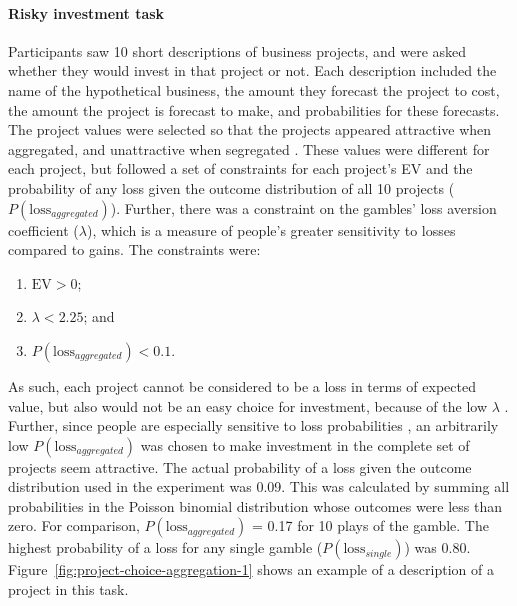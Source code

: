 \documentclass[a4paper, nobind, dvipsnames]{templates/ociamthesis}
\theoremstyle{definition}
\theoremstyle{definition}
\theoremstyle{definition}
\theoremstyle{definition}
\theoremstyle{remark}
\begin{document}
\hypertarget{task-aggregation-1}{%
\paragraph{Risky investment task}\label{task-aggregation-1}}

Participants saw 10 short descriptions of business projects, and were asked
whether they would invest in that project or not. Each description included the
name of the hypothetical business, the amount they forecast the project to cost,
the amount the project is forecast to make, and probabilities for these
forecasts. The project values were selected so that the projects appeared
attractive when aggregated, and unattractive when segregated \autocite[see][]{langer2001}.
These values were different for each project, but followed a set of constraints
for each project's EV and the probability of any loss given the outcome
distribution of all 10 projects (\(P(\text{loss}_{aggregated})\)). Further, there
was a constraint on the gambles' loss aversion coefficient (\(\lambda\)), which is
a measure of people's greater sensitivity to losses compared to gains. The
constraints were:

\begin{enumerate}
\def\labelenumi{\arabic{enumi}.}
\item
  \(\text{EV} > 0\);
\item
  \(\lambda < 2.25\); and
\item
  \(P(\text{loss}_{aggregated}) < 0.1\).
\end{enumerate}

As such, each project cannot be considered to be a loss in terms of expected
value, but also would not be an easy choice for investment, because of the low
\(\lambda\) \autocite[made to be lower than the median loss aversion coefficient calculated
in][]{tversky1992}. Further, since people are especially sensitive to loss
probabilities \autocite{zeisberger2020,kahneman1979}, an arbitrarily low
\(P(\text{loss}_{aggregated})\) was chosen to make investment in the complete set
of projects seem attractive. The actual probability of a loss given the outcome
distribution used in the experiment was 0.09.
This was calculated by summing all probabilities in the Poisson binomial
distribution whose outcomes were less than zero. For comparison,
\(P(\text{loss}_{aggregated})\) = 0.17
for 10 plays of the \textcite{samuelson1963} gamble. The highest probability of a loss for
any single gamble (\(P(\text{loss}_{single})\)) was
0.80.
Figure~\ref{fig:project-choice-aggregation-1} shows an example of a description
of a project in this task.
\end{document}
